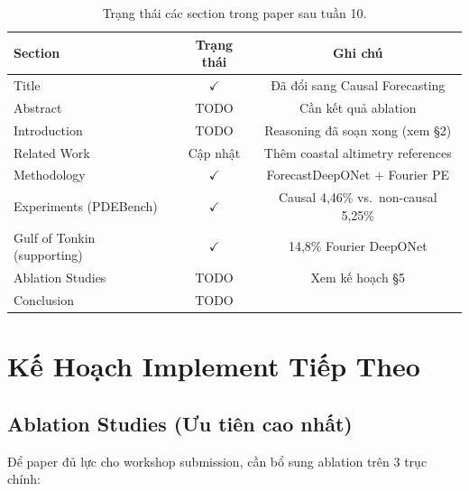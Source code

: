 \documentclass[12pt,a4paper]{article}
\begin{document}
\begin{table}[ht]
  \centering
  \caption{Trạng thái các section trong paper sau tuần 10.}
  \label{tab:paper_status}
  \begin{tabular}{@{}lcc@{}}
    \toprule
    \textbf{Section} & \textbf{Trạng thái} & \textbf{Ghi chú} \\
    \midrule
    Title & $\checkmark$ & Đã đổi sang Causal Forecasting \\
    Abstract & TODO & Cần kết quả ablation \\
    Introduction & TODO & Reasoning đã soạn xong (xem \S2) \\
    Related Work & Cập nhật & Thêm coastal altimetry references \\
    Methodology & $\checkmark$ & ForecastDeepONet + Fourier PE \\
    Experiments (PDEBench) & $\checkmark$ & Causal 4,46\% vs.\ non-causal 5,25\% \\
    Gulf of Tonkin (supporting) & $\checkmark$ & 14,8\% Fourier DeepONet \\
    Ablation Studies & TODO & Xem kế hoạch \S5 \\
    Conclusion & TODO & \\
    \bottomrule
  \end{tabular}
\end{table}


\section{Kế Hoạch Implement Tiếp Theo}

\subsection{Ablation Studies (Ưu tiên cao nhất)}

Để paper đủ lực cho workshop submission, cần bổ sung ablation trên 3 trục chính:
\end{document}
